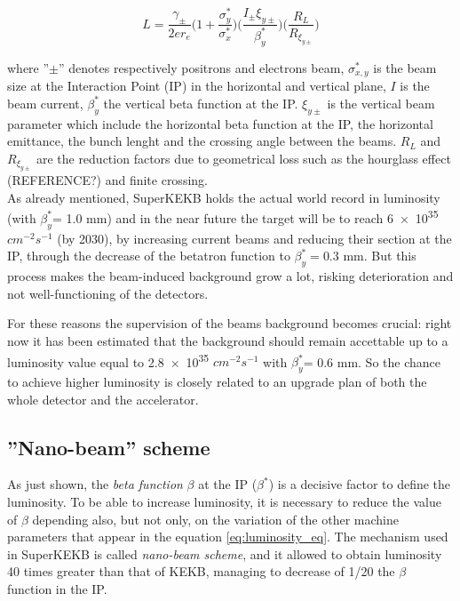 \begin{equation} \label{eq:luminosity_eq}
L = \frac{\gamma_{\pm}}{2er_{e}} \bigg(1 + \frac{\sigma_{y}^{*}}{\sigma_{x}^{*}} \bigg) \bigg(\frac{I_{\pm}\xi_{y\pm}}{\beta^{*}_{y}} \bigg) \bigg(\frac{R_{L}}{R_{\xi_{y\pm}}} \bigg)
\end{equation}

where ''$\pm$'' denotes respectively positrons and electrons beam, $\sigma_{x,y}^{*}$ is the beam size at the Interaction Point (IP) in the horizontal and vertical plane, $I$ is the beam current, $\beta_{y}^{*}$ the vertical beta function at the IP. $\xi_{y\pm}$ is the vertical beam parameter which include the horizontal beta function at the IP, the horizontal emittance, the bunch lenght and the crossing angle between the beams. $R_{L}$ and $R_{\xi_{y\pm}}$ are the reduction factors due to geometrical loss such as the hourglass effect (REFERENCE?) and finite crossing.\\

As already mentioned, SuperKEKB holds the actual world record in luminosity (with $\beta^{*}_{y}$= 1.0 mm) and in the near future the target will be to reach \num{6e35} $cm^{-2} s^{-1}$ (by 2030), by increasing current beams and reducing their section at the IP, through the decrease of the betatron function to $\beta^{*}_{y}= 0.3$ mm. But this process makes the beam-induced background grow a lot, risking deterioration and not well-functioning of the detectors.

For these reasons the supervision of the beams background becomes crucial: right now it has been estimated that the background should remain accettable up to a luminosity value equal to \num{2.8e35} $cm^{-2} s^{-1}$ with $\beta^{*}_{y}$= 0.6 mm.
So the chance to achieve higher luminosity is closely related to an upgrade plan of both the whole detector and the accelerator.


\subsection{''Nano-beam'' scheme} \label{nano_beam}

As just shown, the \textit{beta function} $\beta$ at the IP ($\beta^{*}$) is a decisive factor to define the luminosity. To be able to increase luminosity, it is necessary to reduce the value of $\beta$ depending also, but not only, on the variation of the other machine parameters that appear in the equation \vref{eq:luminosity_eq}.
The mechanism used in SuperKEKB is called \textit{nano-beam scheme}, and it allowed to obtain luminosity 40 times greater than that of KEKB, managing to decrease of 1/20 the $\beta$ function in the IP.\\

